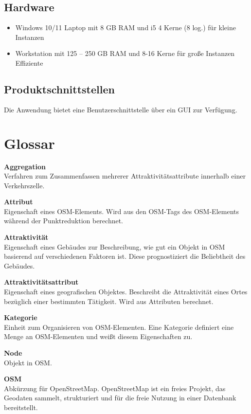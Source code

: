 \documentclass[parskip=full]{scrartcl} %
\begin{document}
\subsection{Hardware}
\begin{itemize}
    \item Windows 10/11 Laptop mit 8 GB RAM und i5 4 Kerne (8 log.) für kleine Instanzen
    \item Workstation mit 125 – 250 GB RAM und 8-16 Kerne für große Instanzen Effiziente
\end{itemize}

\subsection{Produktschnittstellen}
Die Anwendung bietet eine Benutzerschnittstelle über ein GUI zur Verfügung.
\newpage





\section{Glossar}

\textbf{Aggregation}\\
Verfahren zum Zusammenfassen mehrerer Attraktivitätsattribute innerhalb einer Verkehrszelle.

\textbf{Attribut}\\
Eigenschaft eines OSM-Elements. Wird aus den OSM-Tags des OSM-Elements während der Punktreduktion berechnet.

\textbf{Attraktivität}\\
Eigenschaft eines Gebäudes zur Beschreibung, wie gut ein Objekt in OSM basierend auf verschiedenen Faktoren ist. Diese prognostiziert die Beliebtheit des Gebäudes.

\textbf{Attraktivitätsattribut}\\
Eigenschaft eines geografischen Objektes. Beschreibt die Attraktivität eines Ortes bezüglich einer bestimmten Tätigkeit. Wird aus Attributen berechnet.

\textbf{Kategorie}\\
Einheit zum Organisieren von OSM-Elementen. Eine Kategorie definiert eine Menge an OSM-Elementen und weißt diesem Eigenschaften zu.

\textbf{Node}\\
Objekt in OSM.

\textbf{OSM}\\
Abkürzung für OpenStreetMap. OpenStreetMap ist ein freies Projekt, das Geodaten sammelt, strukturiert und für die freie Nutzung in einer Datenbank bereitstellt.
\end{document}
